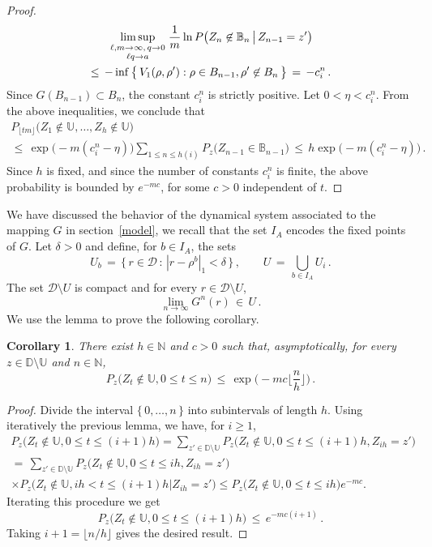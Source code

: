 \documentclass[a4paper,12pt]{article}
\newtheorem{corollary}[theorem]{Corollary}
\theoremstyle{definition}
\theoremstyle{remark}
\def \cD {\mathcal{D}}
\def \d {\delta}
\def \B {\mathbb{B}}
\def \dD {\mathbb{D}}
\def \N {\mathbb{N}}
\def \dU {\mathbb{U}}
\def\lmqq {{\genfrac{}{}{0pt}{1}{\ell,m\to\infty,\,q\to0}{\ell q\to a}}}
\begin{document}
\begin{proof}
\begin{multline*}
\limsup_\lmqq \frac{1}{m}\ln
P\big(
Z_n\not\in  \B_n\,\big|\,
Z_{n-1}=z'
\big)\\
\leq\,
-\inf\big\lbrace\,
V_1(\rho,\rho'):\rho\in B_{n-1}, \rho'\not\in B_n
\,\big\rbrace\,=\,-c_i^{n}\,.
\end{multline*}
Since $G(B_{n-1})\subset B_n$,
the constant $c^{n}_i$ is strictly positive.
Let $0<\eta<c^n_i$.
From the above inequalities, we conclude that
\begin{multline*}
P_{\lfloor tm \rfloor}\big(
Z_1\not\in \dU,\dots,Z_{h}\not\in \dU
\big)\\
\leq\,\exp\big(
-m(c_i^n-\eta)
\big)\sum_{1\leq n\leq h(i)}
P_{z}\big(
Z_{n-1}\in \B_{n-1}
\big)\,\leq\,
h\exp\big(
-m(c^n_i-\eta)
\big)\,.
\end{multline*}
Since $h$ is fixed, 
and since the number of constants $c^n_i$ is finite,
the above probability is bounded by $e^{-mc}$,
for some $c>0$ independent of $t$.
\end{proof}
We have discussed the behavior of the dynamical system associated to the mapping $G$
in section~\ref{model}, we recall that the set $I_A$ encodes the fixed points of $G$.
Let $\d>0$ and define, for $b\in I_A$, the sets
$$U_b\,=\,\big\lbrace\,
r\in\cD\,:\,|r-\rho^{b}|_1<\d
\,\big\rbrace\,,\qquad
U\,=\,\bigcup_{b\in I_A}U_i\,.$$
The set $\cD\setminus U$ is compact and for every $r\in\cD\setminus U$,
$$\lim_{n\to\infty}G^n(r)\,\in\,U\,.$$
We use the lemma to prove the following corollary.
\begin{corollary}\label{timefar2}
There exist $h\in\N$ and $c>0$ such that, asymptotically,
for every $z\in\dD\setminus\dU$ and $n\in\N$, 
$$P_{z}\Big(
Z_t\not\in \dU,0\leq t\leq n
\Big)\,\leq\,
\exp\Big(
-mc\Big\lfloor\frac{n}{h}\Big\rfloor
\Big)\,.$$
\end{corollary}
\begin{proof}
Divide the interval $\lbrace\,0,\dots,n\,\rbrace$
into subintervals of length $h$.
Using iteratively the previous lemma,
we have, for $i\geq 1$,
\begin{multline*}
\!\!\!\!P_{z}\big(
Z_t\not\in \dU,0\leq t\leq (i+1)h
\big)
=\!\!\!\sum_{z'\in\dD\setminus \dU}\!\!
P_{z}\big(
Z_t\not\in \dU,0\leq t\leq (i+1)h,Z_{ih}=z'
\big)\\
=\,\sum_{z'\in\dD\setminus \dU}
P_{z}\big(
Z_t\not\in \dU,0\leq t\leq ih,Z_{ih}=z'
\big)\\
\times P_{z}\big(
Z_t\not\in \dU, i h<t\leq (i+1)h\big|Z_{i h}=z'
\big)
\leq P_{z}\big(
Z_t\not\in \dU,0\leq t\leq ih
\big)e^{-m c}.
\end{multline*}
Iterating this procedure we get
$$P_{z}\big(
Z_t\not\in \dU,0\leq t\leq (i+1)h
\big)\,\leq\,
e^{-mc(i+1)}\,.$$
Taking $i+1=\lfloor n/h\rfloor$ gives the desired result. 
\end{proof}
\end{document}
